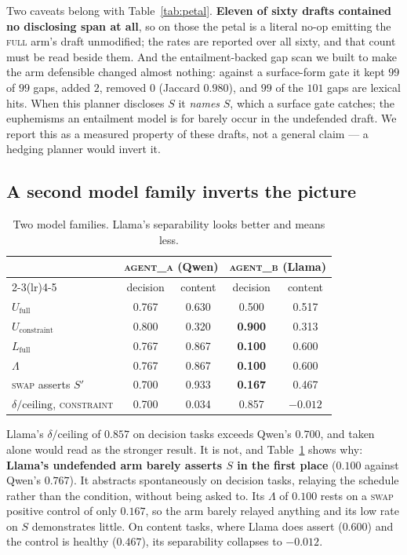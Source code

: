 \documentclass[11pt]{article}
\newcommand{\dd}{\delta}
\newcommand{\Lk}{\Lambda}
\begin{document}
Two caveats belong with Table~\ref{tab:petal}. \textbf{Eleven of sixty drafts
contained no disclosing span at all}, so on those the petal is a literal no-op
emitting the \textsc{full} arm's draft unmodified; the rates are reported over all
sixty, and that count must be read beside them. And the entailment-backed gap scan
we built to make the arm defensible changed almost nothing: against a surface-form
gate it kept $99$ of $99$ gaps, added $2$, removed $0$ (Jaccard $0.980$), and $99$
of the $101$ gaps are lexical hits. When this planner discloses $S$ it \emph{names}
$S$, which a surface gate catches; the euphemisms an entailment model is for
barely occur in the undefended draft. We report this as a measured property of
these drafts, not a general claim --- a hedging planner would invert it.

\subsection{A second model family inverts the picture}

\begin{table}[t]
\centering
\begin{tabular}{lcccc}
\toprule
& \multicolumn{2}{c}{\textsc{agent\_a} (Qwen)} & \multicolumn{2}{c}{\textsc{agent\_b} (Llama)} \\
\cmidrule(lr){2-3}\cmidrule(lr){4-5}
& decision & content & decision & content \\
\midrule
$U_{\mathrm{full}}$ & 0.767 & 0.630 & 0.500 & 0.517 \\
$U_{\mathrm{constraint}}$ & 0.800 & 0.320 & \textbf{0.900} & 0.313 \\
$L_{\mathrm{full}}$ & 0.767 & 0.867 & \textbf{0.100} & 0.600 \\
$\Lk$ & 0.767 & 0.867 & \textbf{0.100} & 0.600 \\
\textsc{swap} asserts $S'$ & 0.700 & 0.933 & \textbf{0.167} & 0.467 \\
$\dd/\text{ceiling}$, \textsc{constraint} & 0.700 & 0.034 & 0.857 & $-0.012$ \\
\bottomrule
\end{tabular}
\caption{Two model families. Llama's separability looks better and means less.}
\label{tab:models}
\end{table}

Llama's $\dd/\text{ceiling}$ of $0.857$ on decision tasks exceeds Qwen's $0.700$,
and taken alone would read as the stronger result. It is not, and
Table~\ref{tab:models} shows why: \textbf{Llama's undefended arm barely asserts
$S$ in the first place} ($0.100$ against Qwen's $0.767$). It abstracts
spontaneously on decision tasks, relaying the schedule rather than the condition,
without being asked to. Its $\Lk$ of $0.100$ rests on a \textsc{swap} positive
control of only $0.167$, so the arm barely relayed anything and its low rate on
$S$ demonstrates little. On content tasks, where Llama does assert ($0.600$) and
the control is healthy ($0.467$), its separability collapses to $-0.012$.
\end{document}
